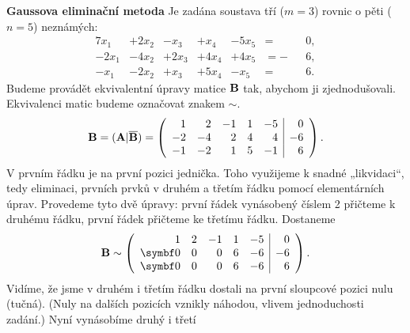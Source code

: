 \begin{mdframed}[style=mdexam]
  \begin{example}\label{mai:exam038}
    \textbf{Gaussova eliminační metoda}\newline
    Je zadána soustava tří (\(m = 3\)) rovnic o pěti (\(n = 5\)) neznámých:
    \begin{alignat*}{7}
        x_1 &+ 2x_2 &-  x_3 &+  x_4 &- 5x_5 &=  &&0, \\
      -2x_1 &- 4x_2 &+ 2x_3 &+ 4x_4 &+ 4x_5 &= -&&6, \\
       -x_1 &- 2x_2 &+  x_3 &+ 5x_4 &-  x_5 &=  &&6.
    \end{alignat*}
    Budeme provádět ekvivalentní úpravy matice \(\mathbf{B}\) tak, abychom ji zjednodušovali.
    Ekvivalenci matic budeme označovat znakem \(\sim\). 
    \begingroup
      \renewcommand\arraystretch{1.0}
      \renewcommand\arraycolsep{3pt}
      \begin{equation*}
        \mathbf{B} = (\mathbf{A}\lvert\overline{\mathbf{B}}) =
        \left(
          \begin{array}{rrrrr|r}
             1 &  2 & -1 & 1 & -5 &  0    \\
            -2 & -4 &  2 & 4 &  4 & -6    \\
            -1 & -2 &  1 & 5 & -1 &  6
          \end{array}
        \right).
      \end{equation*}
    \endgroup
    V prvním řádku je na první pozici jednička. Toho využijeme k snadné „likvidaci“, tedy eliminaci,
    prvních prvků v druhém a třetím řádku pomocí elementárních úprav. Provedeme tyto dvě úpravy:
    první řádek vynásobený číslem \num{2} přičteme k druhému řádku, první řádek přičteme ke třetímu
    řádku. Dostaneme
    \begingroup
      \renewcommand\arraystretch{1.0}
      \renewcommand\arraycolsep{3pt}
      \begin{equation*}
        \matr{B} \sim
        \left(
          \begin{array}{rrrrr|r}
            1 &  2 & -1 & 1 & -5 &  0         \\
            \bm{0} &  0 &  0 & 6 & -6 & -6    \\
            \bm{0} &  0 &  0 & 6 & -6 &  6
          \end{array}
        \right).
      \end{equation*}
    \endgroup  
    Vidíme, že jsme v druhém i třetím řádku dostali na první sloupcové pozici nulu (tučná). (Nuly na
    dalších  pozicích vznikly náhodou, vlivem jednoduchosti zadání.) Nyní vynásobíme druhý i třetí

\end{example}
\end{mdframed}

